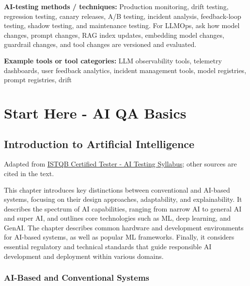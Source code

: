 \documentclass[
  letterpaper,
  DIV=11,
  numbers=noendperiod,
  oneside]{scrreprt}
\begin{document}
\begin{tcolorbox}[enhanced jigsaw, arc=.35mm, bottomrule=.15mm, bottomtitle=1mm, breakable, colback=white, colbacktitle=quarto-callout-tip-color!10!white, colframe=quarto-callout-tip-color-frame, coltitle=black, left=2mm, leftrule=.75mm, opacityback=0, opacitybacktitle=0.6, rightrule=.15mm, title=\textcolor{quarto-callout-tip-color}{\faLightbulb}\hspace{0.5em}{How do we monitor the system after release?}, titlerule=0mm, toprule=.15mm, toptitle=1mm]

\textbf{AI-testing methods / techniques:} Production monitoring, drift
testing, regression testing, canary releases, A/B testing, incident
analysis, feedback-loop testing, shadow testing, and maintenance
testing. For LLMOps, ask how model changes, prompt changes, RAG index
updates, embedding model changes, guardrail changes, and tool changes
are versioned and evaluated.

\textbf{Example tools or tool categories:} LLM observability tools,
telemetry dashboards, user feedback analytics, incident management
tools, model registries, prompt registries, drift

\part{Start Here - AI QA Basics}

\chapter{Introduction to Artificial
Intelligence}\label{introduction-to-artificial-intelligence}

Adapted from
\href{https://istqb.org/certifications/certified-tester-ai-testing-ct-ai/}{ISTQB
Certified Tester - AI Testing Syllabus}; other sources are cited in the
text.

This chapter introduces key distinctions between conventional and
AI-based system{}s, focusing on their design approaches, adaptability,
and explainability. It describes the spectrum of AI capabilities,
ranging from narrow AI to general AI and super AI, and outlines core
technologies such as ML, deep learning, and GenAI. The chapter describes
common hardware and development environments for AI-based systems, as
well as popular ML frameworks. Finally, it considers essential
regulatory and technical standards that guide responsible AI development
and deployment within various domains.

\section{AI-Based and Conventional
Systems}\label{ai-based-and-conventional-systems}


\end{tcolorbox}
\end{document}
